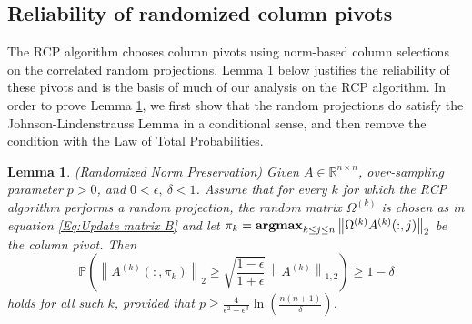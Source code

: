 \documentclass[11pt]{article}
\newtheorem{lemma}{Lemma}[section]
\begin{document}
\subsection{Reliability of randomized column pivots}
The RCP algorithm chooses column pivots using norm-based column selections on the correlated random projections. Lemma \ref{Le:Randomized Norm Preservation} below justifies the reliability of these pivots and is the basis of much of our analysis on the RCP algorithm. In order to prove Lemma \ref{Le:Randomized Norm Preservation}, we first show that the random projections do satisfy the Johnson-Lindenstrauss Lemma in a conditional sense, and then remove the condition with the Law of Total Probabilities. 

\begin{lemma}\label{Le:Randomized Norm Preservation}
(Randomized Norm Preservation) 
Given $A \in \mathbb{R}^{n \times n}$, over-sampling parameter $p > 0$, and $0 < \epsilon, ~\delta < 1$. Assume that for every $k$ for which the RCP algorithm performs a random projection, the random matrix $\Omega^{(k)}$ is chosen as in equation \eqref{Eq:Update matrix B} and let $\pi_k = {\bf argmax}_{k \le j \le n} \left\| \Omega^{(k)} A^{(k)}( : , j) \right\|_2$ be the column pivot. Then 
\begin{equation}\label{Eq:Randomized Norm Preservation}
\mathbb{P} \left( \left\| A^{(k)}( : , \pi_k) \right\|_2  \ge \sqrt{ \frac{1 - \epsilon}{1 + \epsilon} } \,  \left\| A^{(k)} \right\|_{1,2} \right) \ge 1- \delta
\end{equation}
holds for all such $k$, provided that $p \ge \frac{4}{\epsilon^2 - \epsilon^3} \ln{ \left( \frac{n(n + 1)}{\delta} \right) } $.
\end{lemma}
\end{document}
